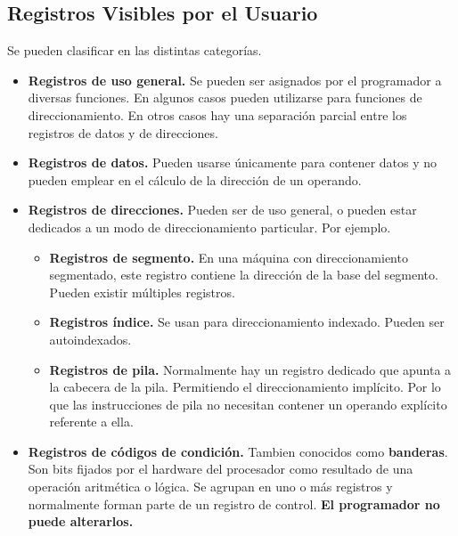 \documentclass{article}
\begin{document}
\subsection*{Registros Visibles por el Usuario}
Se pueden clasificar en las distintas categor\'{i}as.
\begin{itemize}
      \item \textbf{Registros de uso general.}
            Se pueden ser asignados por el programador a diversas funciones.
            En algunos casos pueden utilizarse para funciones de direccionamiento.
            En otros casos hay una separaci\'{o}n parcial entre los registros de
            datos y de direcciones.
      \item \textbf{Registros de datos.}
            Pueden usarse \'{u}nicamente para contener datos y no pueden emplear
            en el c\'{a}lculo de la direcci\'{o}n de un operando.
      \item \textbf{Registros de direcciones.}
            Pueden ser de uso general, o pueden estar dedicados a un modo de
            direccionamiento particular. Por ejemplo.
            \begin{itemize}
                  \item \textbf{Registros de segmento.}
                        En una m\'{a}quina con direccionamiento segmentado,
                        este registro contiene la direcci\'{o}n de la base del
                        segmento. Pueden existir m\'{u}ltiples registros.
                  \item \textbf{Registros \'{i}ndice.}
                        Se usan para direccionamiento indexado. Pueden ser autoindexados.
                  \item \textbf{Registros de pila.}
                        Normalmente hay un registro dedicado que apunta a la cabecera
                        de la pila. Permitiendo el direccionamiento impl\'{i}cito.
                        Por lo que las instrucciones de pila no necesitan contener un
                        operando expl\'{i}cito referente a ella.
            \end{itemize}
      \item \textbf{Registros de c\'{o}digos de condici\'{o}n.}
            Tambien conocidos como \textbf{banderas}. Son bits fijados por el
            hardware del procesador como resultado de una operaci\'{o}n aritm\'{e}tica
            o l\'{o}gica. Se agrupan en uno o m\'{a}s registros y normalmente forman parte
            de un registro de control. \textbf{El programador no puede alterarlos.}
\end{itemize}
\end{document}
